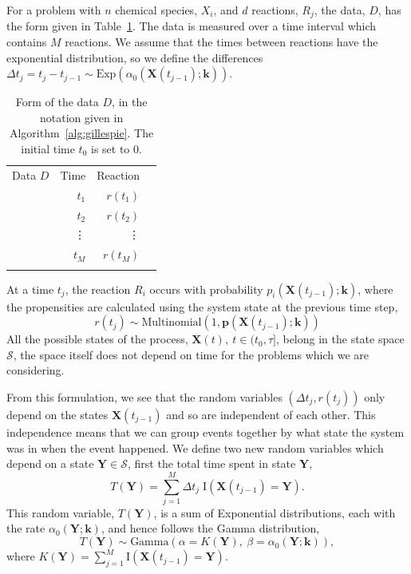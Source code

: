 \documentclass[final]{siamltex}
\begin{document}
For a problem with $n$ chemical species, $X_i$,  and $d$ reactions, $R_j$, the data, $D$, has the form given in Table~\ref{tab:chem_data}. The data is measured over a time interval which contains $M$ reactions. We assume that the times between reactions have the exponential distribution, so we define the differences $\Delta t_j = t_{j}-t_{j-1} \sim \text{Exp}\left(\alpha_0(\mathbf{X}(t_{j-1});\mathbf{k})\right)$.

\begin{table}[!h]
\centering
\begin{tabular}{l|r|r|r|}
	\hhline{~|--|}
	Data $D$ \quad & Time & Reaction \\ \hhline{~|=|=|}
	& $t_1$	& $r(t_1)$ \\
	& $t_2$	& $r(t_2)$ \\
	& \vdots & \vdots \\
	& $t_M$	& $r(t_M)$ \\ \hhline{~|--|}
 \end{tabular}
\caption{Form of the data $D$, in the notation given in Algorithm~\ref{alg:gillespie}. The initial time $t_0$ is set to 0.}
\label{tab:chem_data}
\end{table}

At a time $t_j$, the reaction $R_i$ occurs with probability $p_i(\mathbf{X}(t_{j-1});\mathbf{k})$, where the propensities are calculated using the system state at the previous time step,
\[
	r(t_j) \sim \text{Multinomial}\left(1, \mathbf{p}(\mathbf{X}(t_{j-1});\mathbf{k})\right)
\]
All the possible states of the process, $\mathbf{X}(t),\ t \in (t_0,\tau]$, belong in the state space $\mathcal{S}$, the space itself does not depend on time for the problems which we are considering.

From this formulation, we see that the random variables $(\Delta t_j, r(t_j))$ only depend on the states $\mathbf{X}(t_{j-1})$ and so are independent of each other. This independence means that we can group events together by what state the system was in when the event happened. We define two new random variables which depend on a state $\mathbf{Y} \in \mathcal{S}$, first the total time spent in state $\mathbf{Y}$,
\[
	T(\mathbf{Y}) = \sum\limits_{j=1}^M \Delta t_j\; \text{I}(\mathbf{X}(t_{j-1}) = \mathbf{Y}).
\]
This random variable, $T(\mathbf{Y})$, is a sum of Exponential distributions, each with the rate $\alpha_0(\mathbf{Y};\mathbf{k})$, and hence follows the Gamma distribution,
\begin{equation}\label{eqn:chem_time_dist}
	T(\mathbf{Y}) \sim \text{Gamma}\left(\alpha=K(\mathbf{Y}),~\beta = \alpha_0(\mathbf{Y}; \mathbf{k})\right),
\end{equation}
where $K(\mathbf{Y}) = \sum\limits_{j=1}^M \text{I}(\mathbf{X}(t_{j-1}) = \mathbf{Y})$.
\end{document}
